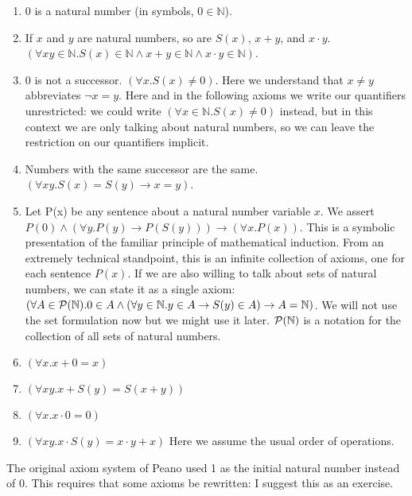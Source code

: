 \documentclass[12pt]{article}
\begin{document}
\begin{enumerate}

\item 0 is a natural number (in symbols, $0 \in {\mathbb N}$).

\item If $x$ and $y$ are natural numbers, so are $S(x)$, $x+y$, and $x
\cdot y$.  $(\forall xy \in {\mathbb N}.S(x) \in {\mathbb N} \wedge
x+y \in {\mathbb N} \wedge x \cdot y \in {\mathbb N})$.

\item 0 is not a successor.  $(\forall x.S(x) \neq 0)$.  Here we
understand that $x\neq y$ abbreviates $\neg x=y$.  Here and in the
following axioms we write our quantifiers unrestricted: we could write
$(\forall x \in {\mathbb N}.S(x) \neq 0)$ instead, but in this context
we are only talking about natural numbers, so we can leave the
restriction on our quantifiers implicit.

\item Numbers with the same successor are the same.  $(\forall xy.S(x)
= S(y) \rightarrow x=y)$.

\item Let P(x) be any sentence about a natural number variable $x$.
We assert $P(0) \wedge (\forall y.P(y) \rightarrow P(S(y)))
\rightarrow (\forall x.P(x))$.  This is a symbolic presentation of the
familiar principle of mathematical induction.  From an extremely
technical standpoint, this is an infinite collection of axioms, one
for each sentence $P(x)$.  If we are also willing to talk about sets
of natural numbers, we can state it as a single axiom: $(\forall A \in
{\cal P}({\mathbb N}).0 \in A \wedge (\forall y \in {\mathbb N}.y \in
A \rightarrow S(y) \in A) \rightarrow A = {\mathbb N})$.  We will not
use the set formulation now but we might use it later.  ${\cal
P}({\mathbb N})$ is a notation for the collection of all sets of
natural numbers.

\item $(\forall x.x+0=x)$

\item $(\forall xy.x+S(y)=S(x+y))$

\item $(\forall x.x\cdot 0 = 0)$

\item $(\forall xy.x \cdot S(y) = x\cdot y +x)$  Here we assume the usual order of operations.
\end{enumerate}

The original axiom system of Peano used 1 as the initial natural
number instead of 0.  This requires that some axioms be rewritten: I
suggest this as an exercise.
\end{document}
